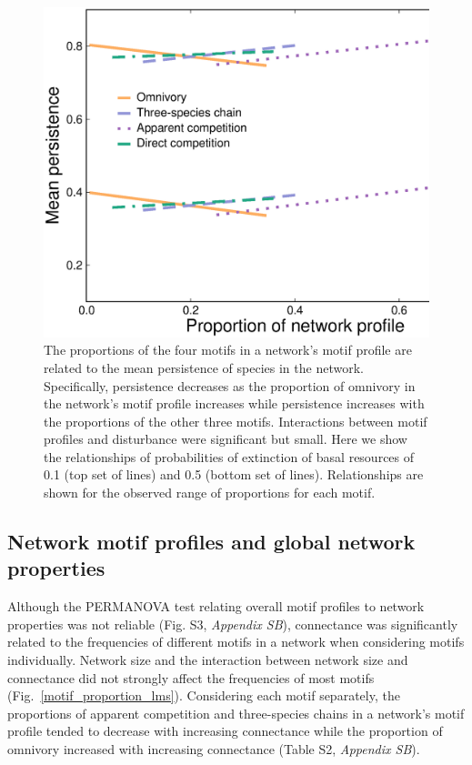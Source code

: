 \documentclass[12pt]{article}
\begin{document}
\begin{spacing}{2.0}
        \begin{figure}
            \centering
            \includegraphics[width=.5\textwidth]{figures/persistence_motif_profiles.eps}
            \caption{The proportions of the four motifs in a network's motif profile are related to the mean persistence of species in the network. Specifically, persistence decreases as the proportion of omnivory in the network's motif profile increases while persistence increases with the proportions of the other three motifs. Interactions between motif profiles and disturbance were significant but small. Here we show the relationships of probabilities of extinction of basal resources of 0.1 (top set of lines) and 0.5 (bottom set of lines). Relationships are shown for the observed range of proportions for each motif.}      
            \label{fig:motif_profile_persistence}
        \end{figure}    


    \subsection*{Network motif profiles and global network properties}

        Although the PERMANOVA test relating overall motif profiles to network properties was not reliable (Fig. S3, \emph{Appendix SB}), 
        connectance was significantly related to the frequencies of different motifs in a network when considering motifs individually.
        Network size and the interaction between network size and connectance did not strongly affect the frequencies of most motifs (Fig.~\ref{motif_proportion_lms}).
        Considering each motif separately, the proportions of apparent competition and three-species chains in a network's motif profile tended to decrease with increasing connectance while the proportion of omnivory increased with increasing connectance (Table S2, \emph{Appendix SB}). 
    

\end{spacing}
\end{document}
